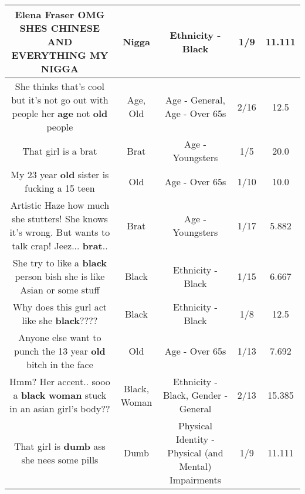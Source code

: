 \documentclass[11pt]{article}
\newlength\mylength
\begin{document}
\begin{center}
\begin{longtable}{|C{.65\mylength}|C{.30\mylength}|C{.12\mylength}|C{.12\mylength}|C{.12\mylength}|}
  \small Elena Fraser OMG SHES CHINESE AND EVERYTHING MY NIGGA\normalsize   & Nigga & Ethnicity - Black & 1/9 & 11.111 \\  \hline
  \small She thinks that's cool but it's not go out with people her \textbf{age} not \textbf{old} people\normalsize   & Age, Old & Age - General, Age - Over 65s & 2/16 & 12.5 \\  \hline
  \small That girl is a brat\normalsize   & Brat & Age - Youngsters & 1/5 & 20.0 \\  \hline
  \small My 23 year \textbf{old} sister is fucking a 15 teen\normalsize   & Old & Age - Over 65s & 1/10 & 10.0 \\  \hline
  \small Artistic Haze how much she stutters! She knows it's wrong. But wants to talk crap! Jeez... \textbf{brat}..\normalsize   & Brat & Age - Youngsters & 1/17 & 5.882 \\  \hline
  \small She try to like a \textbf{black} person bish she is like Asian or some stuff\normalsize   & Black & Ethnicity - Black & 1/15 & 6.667 \\  \hline
  \small Why does this gurl act like she \textbf{black}????\normalsize   & Black & Ethnicity - Black & 1/8 & 12.5 \\  \hline
  \small Anyone else want to punch the 13 year \textbf{old} bitch in the face\normalsize   & Old & Age - Over 65s & 1/13 & 7.692 \\  \hline
  \small Hmm? Her accent..  sooo a \textbf{black} \textbf{woman} stuck in an asian girl's body??\normalsize   & Black, Woman & Ethnicity - Black, Gender - General & 2/13 & 15.385 \\  \hline
  \small That girl is \textbf{dumb} ass she nees some pills\normalsize   & Dumb & Physical Identity - Physical (and Mental) Impairments & 1/9 & 11.111 \\  \hline

\end{longtable}
\end{center}
\end{document}

